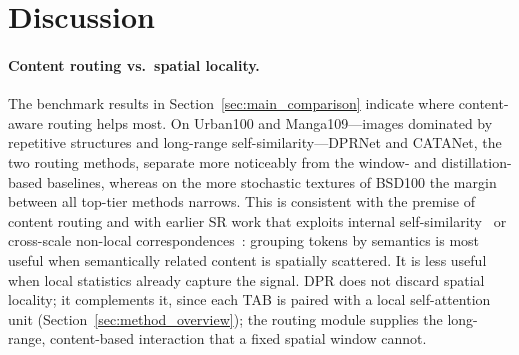 \section{Discussion}
\label{sec:discussion}

\paragraph{Content routing vs.\ spatial locality.}
The benchmark results in Section~\ref{sec:main_comparison} indicate where content-aware
routing helps most. On Urban100 and Manga109---images dominated by repetitive structures
and long-range self-similarity---DPRNet and CATANet, the two routing methods, separate
more noticeably from the window- and distillation-based baselines, whereas on the more
stochastic textures of BSD100 the margin between all top-tier methods narrows. This is
consistent with the premise of content routing and with earlier SR work that
exploits internal self-similarity~\cite{glasner2009single} or cross-scale
non-local correspondences~\cite{mei2020csnln}: grouping tokens by semantics
is most useful when semantically related content is spatially scattered. It is less
useful when local statistics already capture the signal. DPR does not discard spatial
locality; it complements it, since each TAB is paired with a local self-attention unit
(Section~\ref{sec:method_overview}); the routing module supplies the long-range, content-based
interaction that a fixed spatial window cannot.

